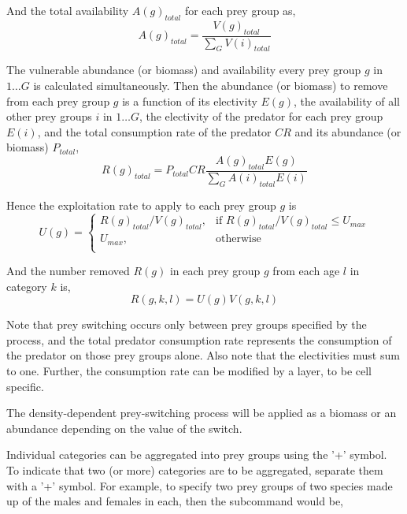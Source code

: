 And the total availability $A(g)_{total}$ for each prey group as,
\begin{equation}
  A(g)_{total} = \frac{V(g)_{total}}{\sum\limits_G {V(i)_{total}}}
\end{equation}

The vulnerable abundance (or biomass) and availability every prey group $g$ in $1 \ldots G$ is calculated simultaneously. Then the abundance (or biomass) to remove from each prey group $g$ is a function of its electivity $E(g)$, the availability of all other prey groups $i$ in $1 \ldots G$, the electivity of the predator for each prey group $E(i)$, and the total consumption rate of the predator $CR$ and its abundance (or biomass) $P_{total}$,
\begin{equation}
  R(g)_{total}=P_{total} CR \frac{A(g)_{total} E(g)}{\sum\limits_G {A(i)_{total} E(i)}}
\end{equation}

Hence the exploitation rate to apply to each prey group $g$ is 
\begin{equation}
U(g) = \begin{cases}
  R(g)_{total}/V(g)_{total}, & \text{if $R(g)_{total}/V(g)_{total} \leq U_{max}$} \\
  U_{max}, & \text{otherwise}\\ 
  \end{cases} 
\end{equation}

And the number removed $R(g)$ in each prey group $g$ from each age $l$ in category $k$ is,
\begin{equation}
  R(g,k,l) = U(g)V(g,k,l)
\end{equation}

Note that prey switching occurs only between prey groups specified by the process, and the total predator consumption rate represents the consumption of the predator on those prey groups alone. Also note that the electivities must sum to one. Further, the consumption rate can be modified by a layer, to be cell specific. 

The density-dependent prey-switching process will be applied as a biomass or an abundance depending on the value of the  switch.

Individual categories can be aggregated into prey groups using the '+' symbol. To indicate that two (or more) categories are to be aggregated, separate them with a '+' symbol. For example, to specify two prey groups of two species made up of the males and females in each, then the subcommand would be,

